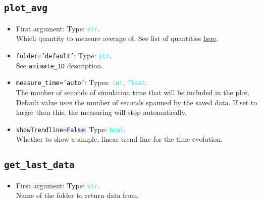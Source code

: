 \documentclass{article}
\newcommand{\ttt}[1]{\texttt{#1}}
\newcommand{\ptype}[1]{\texttt{\textcolor{cyan}{#1}}}
\newcommand{\cbl}[1]{\textcolor{blue}{#1}}
\newcommand{\cro}[1]{\textcolor{RedOrange}{#1}}
\newcommand{\cyo}[1]{\textcolor{YellowOrange}{#1}}
\begin{document}
\subsection{\ttt{plot\_avg}}
\label{sec:pa}
\begin{itemize}
	\item First argument: Type: \ptype{str}.\\Which quantity to measure average of. See list of quantities \hyperref[sec:quants]{here}.
	\item \ttt{\cro{folder}=\cyo{'default'}}: Type: \ptype{str}.\\See \ttt{animate\_1D} description.
	\item \ttt{\cro{measure\_time}=\cyo{'auto'}}: Types: \ptype{int}, \ptype{float}.\\The number of seconds of simulation time that will be included in the plot. Default value uses the number of seconds spanned by the saved data. If set to larger than this, the measuring will stop automatically.
	\item \ttt{\cro{showTrendline}=\cbl{False}}: Type: \ptype{bool}.\\Whether to show a simple, linear trend line for the time evolution.
\end{itemize}

\subsection{\ttt{get\_last\_data}}
\label{sec:gld}
\begin{itemize}
	\item First argument: Type: \ptype{str}.\\Name of the folder to return data from.
\end{itemize}
\end{document}
